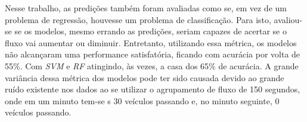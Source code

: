 
Nesse trabalho, as predições também foram avaliadas como se, em vez de um problema de regressão, houvesse um problema de classificação. Para isto, avaliou-se se os modelos, mesmo errando as predições, seriam capazes de acertar se o fluxo vai aumentar ou diminuir. Entretanto, utilizando essa métrica, os modelos não alcançaram uma performance satisfatória, ficando com acurácia por volta de 55\%. Com \textit{\acrshort{SVM}} e \textit{\acrshort{RF}} atingindo, às vezes, a casa dos 65\% de acurácia. A grande variância dessa métrica dos modelos pode ter sido causada devido ao grande ruído existente nos dados ao se utilizar o agrupamento de fluxo de 150 segundos, onde em um minuto tem-se s 30 veículos passando e, no minuto seguinte, 0 veículos passando. 

